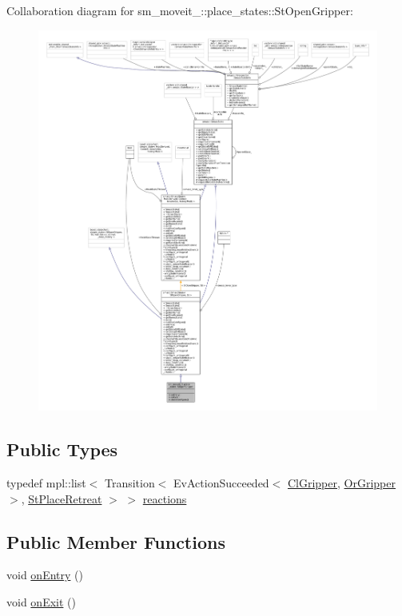 Collaboration diagram for sm\+\_\+moveit\+\_\+:\+:place\+\_\+states\+:\+:St\+Open\+Gripper\+:
\nopagebreak
\begin{figure}[H]
\begin{center}
\leavevmode
\includegraphics[width=350pt]{structsm__moveit__4_1_1place__states_1_1StOpenGripper__coll__graph}
\end{center}
\end{figure}
\subsection*{Public Types}
\begin{DoxyCompactItemize}
\item 
typedef mpl\+::list$<$ Transition$<$ Ev\+Action\+Succeeded$<$ \hyperlink{classsm__moveit__4_1_1cl__gripper_1_1ClGripper}{Cl\+Gripper}, \hyperlink{classsm__moveit__4_1_1OrGripper}{Or\+Gripper} $>$, \hyperlink{structsm__moveit__4_1_1place__states_1_1StPlaceRetreat}{St\+Place\+Retreat} $>$ $>$ \hyperlink{structsm__moveit__4_1_1place__states_1_1StOpenGripper_a66d2d0a95ac3b2d672ac8d3735fd2a3c}{reactions}
\end{DoxyCompactItemize}
\subsection*{Public Member Functions}
\begin{DoxyCompactItemize}
\item 
void \hyperlink{structsm__moveit__4_1_1place__states_1_1StOpenGripper_a9f9a27783751dcb8f993064447c29602}{on\+Entry} ()
\item 
void \hyperlink{structsm__moveit__4_1_1place__states_1_1StOpenGripper_abb7f1ffb0505097dd7d1495c0cc8081a}{on\+Exit} ()
\end{DoxyCompactItemize}
